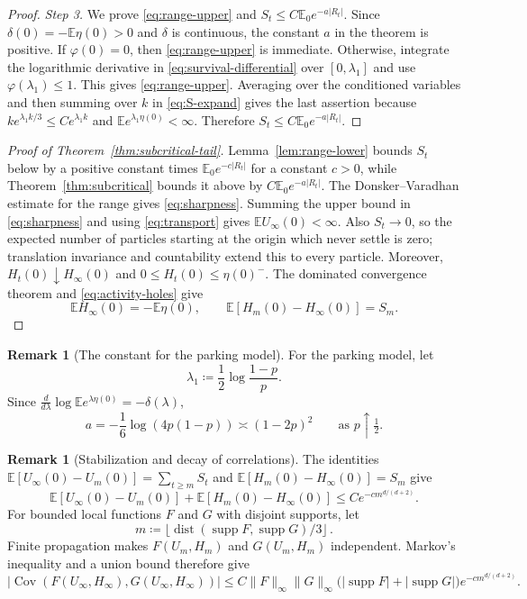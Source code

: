\documentclass[11pt]{amsart}
\theoremstyle{plain}
\theoremstyle{definition}
\newtheorem{remark}[theorem]{Remark}
\newcommand{\E}{\mathbb{E}}
\DeclareMathOperator{\Cov}{Cov}
\begin{document}
\begin{proof}
	\smallskip
	\noindent\emph{Step 3.} We prove \eqref{eq:range-upper} and
	$S_t\leq C\E_0e^{-a|R_t|}$.
	Since $\delta(0)=-\E\eta(0)>0$ and $\delta$ is continuous, the constant
	$a$ in the theorem is positive.
	If $\varphi(0)=0$, then \eqref{eq:range-upper} is immediate. Otherwise,
	integrate the logarithmic derivative in
	\eqref{eq:survival-differential} over $[0,\lambda_1]$ and use
	$\varphi(\lambda_1)\leq1$. This gives \eqref{eq:range-upper}. Averaging over
	the conditioned variables and then summing over $k$ in \eqref{eq:S-expand}
	gives the last assertion because
	$k e^{\lambda_1k/3}\leq C e^{\lambda_1k}$ and
	$\E e^{\lambda_1\eta(0)}<\infty$. Therefore
	$S_t\leq C\E_0e^{-a|R_t|}$.
\end{proof}

\begin{proof}[Proof of Theorem~\ref{thm:subcritical-tail}]
	Lemma~\ref{lem:range-lower} bounds $S_t$ below by a positive constant times
	$\E_0e^{-c|R_t|}$ for a constant $c>0$, while Theorem~\ref{thm:subcritical}
	bounds it above by $C\E_0e^{-a|R_t|}$. The Donsker--Varadhan estimate
	for the range \citep[Theorem~1]{DonskerVaradhan} gives \eqref{eq:sharpness}.
	Summing the upper bound in \eqref{eq:sharpness} and using
	\eqref{eq:transport} gives $\E U_\infty(0)<\infty$. Also $S_t\to0$, so the
	expected number of particles starting at the origin which never settle is
	zero; translation invariance and countability extend this to every particle.
	Moreover, $H_t(0)\downarrow H_\infty(0)$ and
	$0\leq H_t(0)\leq\eta(0)^-$. The dominated convergence theorem and
	\eqref{eq:activity-holes} give
	\[
		\E H_\infty(0)=-\E\eta(0),
		\qquad
		\E[H_m(0)-H_\infty(0)]=S_m.
	\]
\end{proof}

\begin{remark}[The constant for the parking model]\label{rem:tilt}
	For the parking model, let
	\[
		\lambda_1\coloneqq\frac12\log\frac{1-p}{p}.
	\]
	Since
	$\frac d{d\lambda}\log\E e^{\lambda\eta(0)}=-\delta(\lambda)$,
	\[
		a=-\frac16\log(4p(1-p))\asymp(1-2p)^2
		\qquad\text{as }p\uparrow\tfrac12.
	\]
\end{remark}

\begin{remark}[Stabilization and decay of correlations]\label{rem:stabilization-mixing}
	The identities
	$\E[U_\infty(0)-U_m(0)]=\sum_{t\geq m}S_t$ and
	$\E[H_m(0)-H_\infty(0)]=S_m$ give
	\[
		\E[U_\infty(0)-U_m(0)]+\E[H_m(0)-H_\infty(0)]
		\leq Ce^{-cm^{d/(d+2)}}.
	\]
	For bounded local functions $F$ and $G$ with disjoint supports, let
	\[
		m\coloneqq\bigl\lfloor\operatorname{dist}(\operatorname{supp}F,
		\operatorname{supp}G)/3\bigr\rfloor\,.
	\]
	Finite propagation makes $F(U_m,H_m)$ and $G(U_m,H_m)$ independent.
	Markov's inequality and a union bound therefore give
	\[
		|\Cov(F(U_\infty,H_\infty),G(U_\infty,H_\infty))|
		\leq C\|F\|_\infty\|G\|_\infty
		\bigl(|\operatorname{supp}F|+|\operatorname{supp}G|\bigr)
		e^{-cm^{d/(d+2)}}.
	\]
\end{remark}
\end{document}
